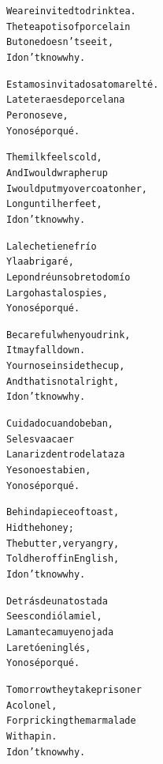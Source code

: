 \documentclass[11pt,a4paper]{article}
\begin{document}
\begin{parcolumns}{2}

\colchunk
{
\begin{alltt}\normalfont
We are invited to drink tea.
The teapot is of porcelain
But one doesn’t see it,
I don’t know why.
\end{alltt}
}

\colchunk
{
\begin{alltt}\normalfont
Estamos invitados a tomar el té.
La tetera es de porcelana
Pero no se ve,
Yo no sé por qué.
\end{alltt}
}

\colplacechunks

\colchunk
{
\begin{alltt}\normalfont
The milk feels cold,
And I would wrap her up
I would put my overcoat on her,
Long until her feet,
I don’t know why.
\end{alltt}
}

\colchunk
{
\begin{alltt}\normalfont
La leche tiene frío
Y la abrigaré,
Le pondré un sobretodo mío
Largo hasta los pies,
Yo no sé por qué.
\end{alltt}
}

\colplacechunks

\colchunk
{
\begin{alltt}\normalfont
Be careful when you drink,
It may fall down.
Your nose inside the cup,
And that is not alright,
I don’t know why.
\end{alltt}
}

\colchunk
{
\begin{alltt}\normalfont
Cuidado cuando beban,
Se les va a caer
La nariz dentro de la taza
Y eso no esta bien,
Yo no sé por qué.
\end{alltt}
}

\colplacechunks

\colchunk
{
\begin{alltt}\normalfont
Behind a piece of toast,
Hid the honey;
The butter, very angry,
Told her off in English,
I don’t know why.
\end{alltt}
}

\colchunk
{
\begin{alltt}\normalfont
Detrás de una tostada
Se escondió la miel,
La manteca muy enojada
La retó en inglés,
Yo no sé por qué.
\end{alltt}
}

\colplacechunks

\colchunk
{
\begin{alltt}\normalfont
Tomorrow they take prisoner
A colonel,
For pricking the marmalade
With a pin.
I don’t know why.
\end{alltt}
}


\end{parcolumns}
\end{document}
